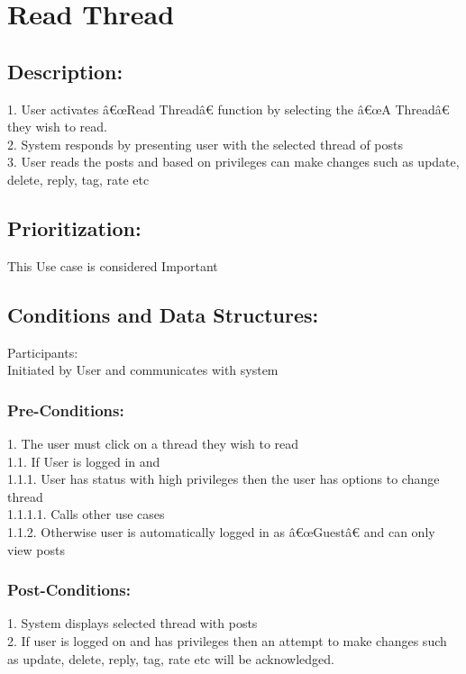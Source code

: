 \documentclass[a4paper,11pt]{article}
\begin{document}
\section{Read Thread}
\subsection*{Description:}
1.	User activates â€œRead Threadâ€ function by selecting the â€œA Threadâ€ they wish to read.\\
2.	System responds by presenting user with the selected thread of posts\\
3.	User reads the posts and based on privileges can make changes such as update, delete, reply, tag, rate etc\\

\subsection{Prioritization:}
This Use case is considered Important\\ 
\subsection{Conditions and Data Structures:}
Participants:\\
Initiated by User and communicates with system\\
\subsubsection*{Pre-Conditions:}
1.	The user must click on a thread they wish to read\\
1.1.	If User is logged in and\\
1.1.1.	User has status with high privileges then the user has options to change thread\\
1.1.1.1.	Calls other use cases\\
1.1.2.	Otherwise user is automatically logged in as â€œGuestâ€ and can only view posts
\subsubsection*{Post-Conditions:}
1.	System displays selected thread with posts\\
2.	If user is logged on and has privileges then an attempt to make changes such as update, delete, reply, tag, rate etc will be acknowledged. 
\end{document}
